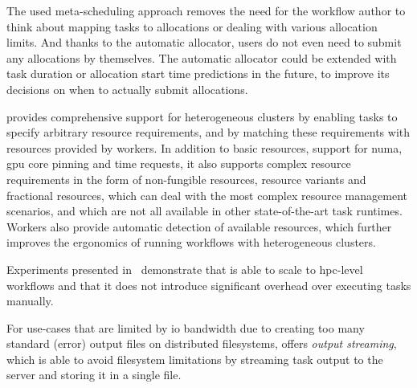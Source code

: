 \begin{description}[wide=0pt]
	\item[Allocation manager] The used meta-scheduling approach removes the need for the workflow author to think about mapping
		tasks to allocations or dealing with various allocation limits. And thanks to the automatic
		allocator, users do not even need to submit any allocations by themselves. The automatic allocator
		could be extended with task duration or allocation start time predictions in the future, to improve
		its decisions on when to actually submit allocations.
	\item[Cluster heterogeneity] \hyperqueue{} provides comprehensive support for heterogeneous
		clusters by enabling tasks to specify arbitrary resource requirements, and by matching these
		requirements with resources provided by workers. In addition to basic resources, support for
		\gls{numa}, \gls{gpu} core pinning and time requests, it also
		supports complex resource requirements in the form of non-fungible resources, resource variants and fractional resources,
		which can deal with the most complex resource management scenarios, and which are not all available in other
		state-of-the-art task runtimes. Workers also provide automatic
		detection of available resources, which further improves the ergonomics of running workflows with
		heterogeneous clusters.
	\item[Performance and scalability] Experiments presented in~ demonstrate that \hyperqueue{} is
		able to scale to \gls{hpc}-level workflows and that it does not introduce
		significant overhead over executing tasks manually.

		For use-cases that are limited by \gls{io} bandwidth due to creating too many
		standard (error) output files on distributed filesystems, \hyperqueue{} offers
		\emph{output streaming}, which is able to avoid filesystem limitations by streaming task output
		to the server and storing it in a single file.


\end{description}
